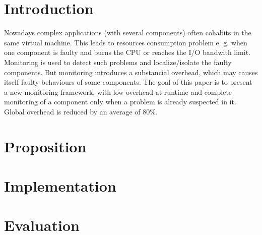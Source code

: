 \section{Introduction}

Nowadays complex applications (with several components) often cohabits in the same virtual machine. This leads to resources consumption problem e. g. when one component is faulty and burns the CPU or reaches the I/O bandwith limit. Monitoring is used to detect such problems and localize/isolate the faulty components. But monitoring introduces a substancial overhead, which may causes itself faulty behaviours of some components. The goal of this paper is to present a new monitoring framework, with low overhead at runtime and complete monitoring of a component only when a problem is already suspected in it. Global overhead is reduced by an average of 80\%.

\section{Proposition}



\section{Implementation}



\section{Evaluation}
